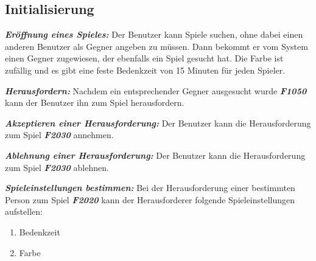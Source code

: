 \documentclass[parskip=full]{scrartcl}
\begin{document}
\subsection{Initialisierung}
\begin{description}
	\hypertarget{F2010}{\item[F2010]}\textbf{\textit{Eröffnung 	eines Spieles: }} Der Benutzer kann Spiele suchen, ohne dabei einen anderen Benutzer als Gegner angeben zu müssen. Dann bekommt er vom System einen Gegner zugewiesen, der ebenfalls ein Spiel gesucht hat. Die Farbe ist zufällig und es gibt eine feste \gls{Bedenkzeit} von 15 Minuten für jeden Spieler.
	
	\item[F2020] \textbf{\textit{Herausfordern: }} Nachdem ein entsprechender Gegner ausgesucht wurde \textbf{\textit{F1050}} kann der Benutzer ihn zum Spiel herausfordern.
	\item [F2030] \textbf{\textit{Akzeptieren einer Herausforderung: }} Der Benutzer kann die Herausforderung zum Spiel \textbf{\textit{F2030}} annehmen.
	\item [F2040] \textbf{\textit{Ablehnung einer Herausforderung: }} Der Benutzer kann die Herausforderung zum Spiel \textbf{\textit{F2030}} ablehnen.
	
	\item[F2050] \textbf{\textit{Spieleinstellungen bestimmen: }} Bei der Herausforderung einer bestimmten Person zum Spiel \textbf{\textit{F2020}} kann der Herausforderer folgende
	Spieleinstellungen aufstellen:
	\begin{enumerate}
		\item \gls{Bedenkzeit}
		\item Farbe
	\end{enumerate}
	
	
	
\end{description}
\end{document}
